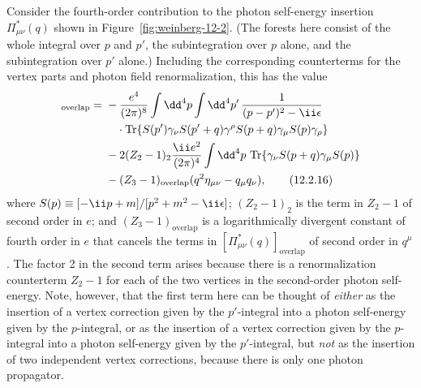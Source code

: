 Consider the fourth-order contribution to the photon self-energy insertion
$\Pi_{\mu\nu}^*(q)$ shown in Figure~\ref{fig:weinberg-12-2}. (The forests here
consist of the whole integral over $p$ and $p'$, the subintegration over $p$
alone, and the subintegration over $p'$ alone.) Including the corresponding
counterterms for the vertex parts and photon field renormalization, this has
the value
\begin{align}
 [\Pi_{\mu\nu}^*(q)]_{\mathrm{overlap}}
 ={}&-\frac{e^4}{(2\pi)^8}\int \dd^4p\int \dd^4p'\,
 \frac{1}{(p-p')^2-\ii\epsilon}
 \notag\\
 &\quad\cdot\operatorname{Tr}\!\left\{
 S(p')\gamma_\nu S(p'+q)\gamma^\rho
 S(p+q)\gamma_\mu S(p)\gamma_\rho\right\}
 \notag\\
 &-2(Z_2-1)_2\frac{\ii e^2}{(2\pi)^4}\int \dd^4p\,
 \operatorname{Tr}\!\left\{\gamma_\nu S(p+q)\gamma_\mu S(p)\right\}
 \notag\\
 &-(Z_3-1)_{\mathrm{overlap}}
 (q^2\eta_{\mu\nu}-q_\mu q_\nu),
 \tag{12.2.16}\label{eq:12.2.16}
\end{align}
where $S(p)\equiv[-\ii\sl{p}+m]/[p^2+m^2-\ii\epsilon]$;
$(Z_2-1)_2$ is the term in $Z_2-1$ of second order in $e$; and
$(Z_3-1)_{\mathrm{overlap}}$ is a logarithmically divergent constant of
fourth order in $e$ that cancels the terms in
$[\Pi_{\mu\nu}^*(q)]_{\mathrm{overlap}}$ of second order in $q^\mu$. The
factor 2 in the second term arises because there is a renormalization
counterterm $Z_2-1$ for each of the two vertices in the second-order photon
self-energy. Note, however, that the first term here can be thought of
\emph{either} as the insertion of a vertex correction given by the
$p'$-integral into a photon self-energy given by the $p$-integral, or as the
insertion of a vertex correction given by the $p$-integral into a photon
self-energy given by the $p'$-integral, but \emph{not} as the insertion of
two independent vertex corrections, because there is only one photon
propagator.

